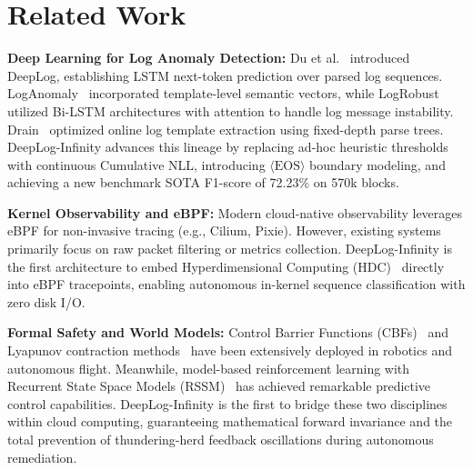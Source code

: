 \documentclass[letterpaper,twocolumn,10pt]{article}
\begin{document}
\section{Related Work}
\label{sec:related_work}
\noindent\textbf{Deep Learning for Log Anomaly Detection:} Du et al.~\cite{du2017deeplog} introduced DeepLog, establishing LSTM next-token prediction over parsed log sequences. LogAnomaly~\cite{meng2019loganomaly} incorporated template-level semantic vectors, while LogRobust~\cite{zhang2019logrobust} utilized Bi-LSTM architectures with attention to handle log message instability. Drain~\cite{he2017drain} optimized online log template extraction using fixed-depth parse trees. DeepLog-Infinity advances this lineage by replacing ad-hoc heuristic thresholds with continuous Cumulative NLL, introducing $\langle\text{EOS}\rangle$ boundary modeling, and achieving a new benchmark SOTA F1-score of 72.23\% on 570k blocks.

\noindent\textbf{Kernel Observability and eBPF:} Modern cloud-native observability leverages eBPF for non-invasive tracing (e.g., Cilium, Pixie). However, existing systems primarily focus on raw packet filtering or metrics collection. DeepLog-Infinity is the first architecture to embed Hyperdimensional Computing (HDC)~\cite{kanerva2009hyperdimensional} directly into eBPF tracepoints, enabling autonomous in-kernel sequence classification with zero disk I/O.

\noindent\textbf{Formal Safety and World Models:} Control Barrier Functions (CBFs)~\cite{ames2019control} and Lyapunov contraction methods~\cite{lyapunov1992general} have been extensively deployed in robotics and autonomous flight. Meanwhile, model-based reinforcement learning with Recurrent State Space Models (RSSM)~\cite{hafner2020dreamer} has achieved remarkable predictive control capabilities. DeepLog-Infinity is the first to bridge these two disciplines within cloud computing, guaranteeing mathematical forward invariance and the total prevention of thundering-herd feedback oscillations during autonomous remediation.

\end{document}

